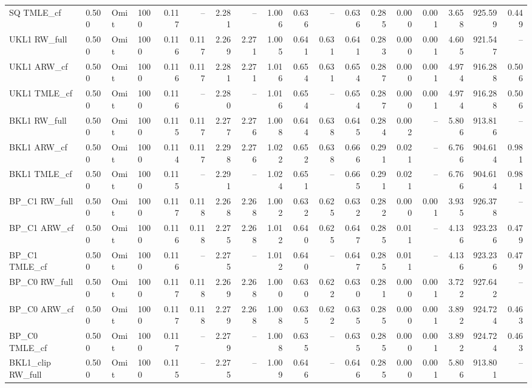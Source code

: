 \begin{tabular}{llllrrrrrrrrrrrrrr}
SQ TMLE\_cf & 0.500 & Omit & 1000 & 0.117 & -- & 2.281 & -- & 1.006 & 0.636 & -- & 0.636 & 0.285 & 0.000 & 0.001 & 3.658 & 925.599 & 0.449 \\
UKL1 RW\_full & 0.500 & Omit & 1000 & 0.116 & 0.117 & 2.269 & 2.271 & 1.005 & 0.641 & 0.631 & 0.641 & 0.283 & 0.000 & 0.001 & 4.605 & 921.547 & -- \\
UKL1 ARW\_cf & 0.500 & Omit & 1000 & 0.116 & 0.117 & 2.281 & 2.271 & 1.016 & 0.654 & 0.631 & 0.654 & 0.287 & 0.000 & 0.001 & 4.974 & 916.288 & 0.506 \\
UKL1 TMLE\_cf & 0.500 & Omit & 1000 & 0.116 & -- & 2.280 & -- & 1.016 & 0.654 & -- & 0.654 & 0.287 & 0.000 & 0.001 & 4.974 & 916.288 & 0.506 \\
BKL1 RW\_full & 0.500 & Omit & 1000 & 0.115 & 0.117 & 2.277 & 2.276 & 1.008 & 0.644 & 0.638 & 0.645 & 0.284 & 0.002 & -- & 5.806 & 913.816 & -- \\
BKL1 ARW\_cf & 0.500 & Omit & 1000 & 0.114 & 0.117 & 2.298 & 2.276 & 1.022 & 0.652 & 0.638 & 0.666 & 0.291 & 0.021 & -- & 6.766 & 904.614 & 0.981 \\
BKL1 TMLE\_cf & 0.500 & Omit & 1000 & 0.115 & -- & 2.291 & -- & 1.024 & 0.651 & -- & 0.665 & 0.291 & 0.021 & -- & 6.766 & 904.614 & 0.981 \\
BP\_C1 RW\_full & 0.500 & Omit & 1000 & 0.117 & 0.118 & 2.268 & 2.268 & 1.002 & 0.632 & 0.625 & 0.632 & 0.282 & 0.000 & 0.001 & 3.935 & 926.378 & -- \\
BP\_C1 ARW\_cf & 0.500 & Omit & 1000 & 0.116 & 0.118 & 2.275 & 2.268 & 1.012 & 0.640 & 0.625 & 0.647 & 0.285 & 0.011 & -- & 4.136 & 923.236 & 0.479 \\
BP\_C1 TMLE\_cf & 0.500 & Omit & 1000 & 0.116 & -- & 2.275 & -- & 1.012 & 0.640 & -- & 0.647 & 0.285 & 0.011 & -- & 4.136 & 923.236 & 0.479 \\
BP\_C0 RW\_full & 0.500 & Omit & 1000 & 0.117 & 0.118 & 2.269 & 2.268 & 1.000 & 0.630 & 0.622 & 0.630 & 0.281 & 0.000 & 0.001 & 3.722 & 927.642 & -- \\
BP\_C0 ARW\_cf & 0.500 & Omit & 1000 & 0.117 & 0.118 & 2.279 & 2.268 & 1.008 & 0.635 & 0.622 & 0.635 & 0.285 & 0.000 & 0.001 & 3.892 & 924.724 & 0.463 \\
BP\_C0 TMLE\_cf & 0.500 & Omit & 1000 & 0.117 & -- & 2.279 & -- & 1.008 & 0.635 & -- & 0.635 & 0.285 & 0.000 & 0.001 & 3.892 & 924.724 & 0.463 \\
BKL1\_clip RW\_full & 0.500 & Omit & 1000 & 0.115 & -- & 2.275 & -- & 1.009 & 0.646 & -- & 0.646 & 0.285 & 0.000 & 0.001 & 5.806 & 913.801 & -- \\

\end{tabular}
